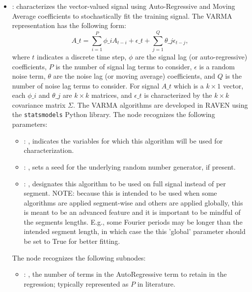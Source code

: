\begin{itemize}
    \item {}:
      characterizes the vector-valued signal using Auto-Regressive and Moving         Average
      coefficients to stochastically fit the training signal.         The VARMA representation has
      the following form:         \begin{equation*}           A\_t = \sum_{i=1}^P \phi\_i A_{t-i} +
      \epsilon\_t + \sum_{j=1}^Q \theta\_j \epsilon_{t-j},         \end{equation*}         where $t$
      indicates a discrete time step, $\phi$ are the signal lag (or auto-regressive)
      coefficients, $P$ is the number of signal lag terms to consider, $\epsilon$ is a random noise
      term, $\theta$ are the noise lag (or moving average) coefficients, and $Q$ is the number of
      noise lag terms to consider. For signal $A\_t$ which is a $k \times 1$ vector, each $\phi\_i$
      and $\theta\_j$ are $k \times k$ matrices, and $\epsilon\_t$ is characterized by the         $k
      \times k$ covariance matrix $\Sigma$. The VARMA algorithms are developed in RAVEN using the
      \texttt{statsmodels} Python library.
      The  node recognizes the following parameters:
        \begin{itemize}
          \item {}: , 
            indicates the variables for which this algorithm will be used for characterization.
          \item {}: , 
            sets a seed for the underlying random number generator, if present.
          \item {}: , 
            designates this algorithm to be used on full signal instead of per
            segment. NOTE: because this is intended to be used when some algorithms are
            applied segment-wise and others are applied globally, this is meant to be an
            advanced feature and it is important to be mindful of the segments lengths.
            E.g., some Fourier periods may be longer than the intended segment length, in
            which case the this 'global' parameter should be set to True for better
            fitting. 
      \end{itemize}

      The  node recognizes the following subnodes:
      \begin{itemize}
        \item {}: , 
          the number of terms in the AutoRegressive term to retain in the
          regression; typically represented as $P$ in literature.


\end{itemize}
\end{itemize}
